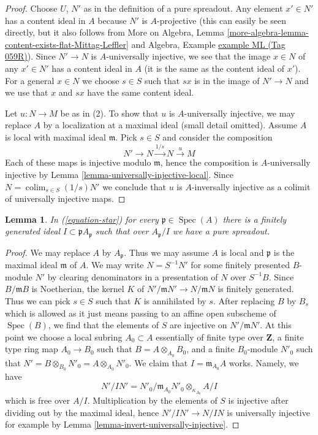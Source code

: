 \documentclass{amsart}
\theoremstyle{plain}
\newtheorem{lemma}[subsection]{Lemma}
\theoremstyle{definition}
\theoremstyle{remark}
\numberwithin{equation}{subsection}
\def\colim{\mathop{\mathrm{colim}}\nolimits}
\def\Spec{\mathop{\mathrm{Spec}}}
\begin{document}
\begin{proof}
Choose $U$, $N'$ as in the definition of a pure spreadout.
Any element $x' \in N'$ has a content ideal in $A$ because
$N'$ is $A$-projective (this can easily be seen directly, but
it also follows from More on Algebra, Lemma
\ref{more-algebra-lemma-content-exists-flat-Mittag-Leffler} and
Algebra, Example \href{https://stacks.math.columbia.edu/tag/059R}{example ML (Tag 059R)}).
Since $N' \to N$ is $A$-universally injective, we see that
the image $x \in N$ of any $x' \in N'$ has a content ideal in $A$
(it is the same as the content ideal of $x'$).
For a general $x \in N$ we choose $s \in S$ such that
$s x$ is in the image of $N' \to N$ and we use that $x$ and $sx$
have the same content ideal.

\medskip\noindent
Let $u : N \to M$ be as in (2). To show that $u$ is $A$-universally
injective, we may replace $A$ by a localization at a maximal ideal
(small detail omitted). Assume $A$ is local with maximal ideal $\mathfrak m$.
Pick $s \in S$ and consider the composition
$$
N' \to N \xrightarrow{1/s} N \xrightarrow{u} M
$$
Each of these maps is injective modulo $\mathfrak m$, hence the composition
is $A$-universally injective by
Lemma \ref{lemma-universally-injective-local}.
Since $N = \colim_{s \in S} (1/s)N'$ we conclude that $u$
is $A$-inversally injective as a colimit of universally injective maps.
\end{proof}


\begin{lemma}
\label{lemma-find-pure-spreadout}
In (\ref{equation-star}) for every $\mathfrak p \in \Spec(A)$
there is a finitely generated ideal $I \subset \mathfrak pA_\mathfrak p$
such that over $A_\mathfrak p/I$ we have a pure spreadout.
\end{lemma}

\begin{proof}
We may replace $A$ by $A_\mathfrak p$. Thus we may assume $A$ is
local and $\mathfrak p$ is the maximal ideal $\mathfrak m$ of $A$.
We may write $N = S^{-1}N'$ for some finitely presented $B$-module $N'$
by clearing denominators in a presentation of $N$ over $S^{-1}B$.
Since $B/\mathfrak m B$ is Noetherian, the kernel $K$ of
$N'/\mathfrak m N' \to N/\mathfrak m N$ is finitely generated.
Thus we can pick $s \in S$ such that $K$ is annihilated by $s$.
After replacing $B$ by $B_s$ which is allowed as it just means passing
to an affine open subscheme of $\Spec(B)$, we find that the elements of $S$
are injective on $N'/\mathfrak m N'$. At this point we choose
a local subring $A_0 \subset A$ essentially of finite type over $\mathbf{Z}$,
a finite type ring map $A_0 \to B_0$ such that $B = A \otimes_{A_0} B_0$,
and a finite $B_0$-module $N'_0$ such that
$N' = B \otimes_{B_0} N'_0 = A \otimes_{A_0} N'_0$.
We claim that $I = \mathfrak m_{A_0} A$ works.
Namely, we have
$$
N'/IN' = N'_0/\mathfrak m_{A_0} N'_0 \otimes_{\kappa_{A_0}} A/I
$$
which is free over $A/I$. Multiplication by the elements of $S$
is injective after dividing out by the maximal ideal, hence
$N'/IN' \to N/IN$ is universally injective for example by
Lemma \ref{lemma-invert-universally-injective}.
\end{proof}
\end{document}
